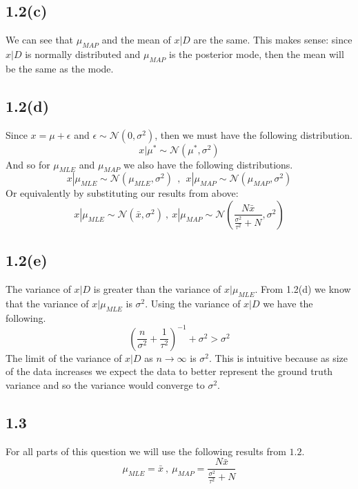 \documentclass[submit]{harvardml}
\begin{document}
\subsection*{1.2(c)}
We can see that $\mu_{MAP}$ and the mean of $x | D$ are the same. This makes sense: since $x | D$ is normally distributed and $\mu_{MAP}$ is the posterior mode, then the mean will be the same as the mode.

\subsection*{1.2(d)}
Since $x = \mu + \epsilon$ and $\epsilon \sim \mathcal{N}(0, \sigma^2)$, then we must have the following distribution.
\begin{equation*}
    x|\mu^* \sim \mathcal{N}(\mu^*, \sigma^2)
\end{equation*}
And so for $\mu_{MLE}$ and $\mu_{MAP}$ we also have the following distributions.
\begin{equation*}
    x|\mu_{MLE} \sim \mathcal{N}(\mu_{MLE}, \sigma^2) \ \ , \ \ x|\mu_{MAP} \sim \mathcal{N}(\mu_{MAP}, \sigma^2)
\end{equation*}
Or equivalently by substituting our results from above:
\begin{equation*}
    x|\mu_{MLE} \sim \mathcal{N}(\bar{x}, \sigma^2) \ , \ x|\mu_{MAP} \sim \mathcal{N}\left(\frac{N \bar{x}}{\frac{\sigma^2}{\tau^2} + N}, \sigma^2\right)
\end{equation*}

\subsection*{1.2(e)}
The variance of $x|D$ is greater than the variance of $x|\mu_{MLE}$. From 1.2(d) we know that the variance of $x|\mu_{MLE}$ is $\sigma^2$. Using the variance of $x|D$ we have the following.
\begin{equation*}
    (\frac{n}{\sigma^2} + \frac{1}{\tau^2})^{-1} + \sigma^2 > \sigma^2
\end{equation*}
The limit of the variance of $x|D$ as $n \rightarrow \infty$ is $\sigma^2$. This is intuitive because as size of the data increases we expect the data to better represent the ground truth variance and so the variance would converge to $\sigma^2$.

\subsection*{1.3}
For all parts of this question we will use the following results from $1.2$.
\begin{equation*}
    \mu_{MLE} = \bar{x} \ , \ \mu_{MAP} = \frac{N \bar{x}}{\frac{\sigma^2}{\tau^2} + N}
\end{equation*}
\end{document}
